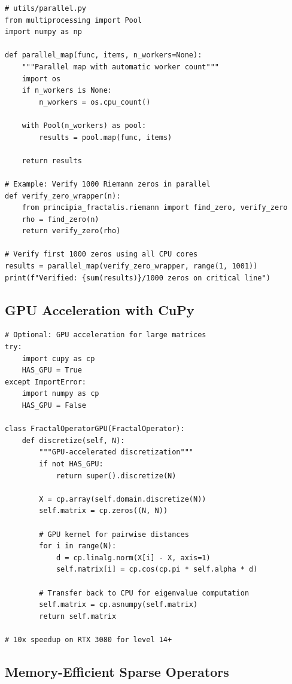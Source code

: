 \begin{verbatim}
# utils/parallel.py
from multiprocessing import Pool
import numpy as np

def parallel_map(func, items, n_workers=None):
    """Parallel map with automatic worker count"""
    import os
    if n_workers is None:
        n_workers = os.cpu_count()

    with Pool(n_workers) as pool:
        results = pool.map(func, items)

    return results

# Example: Verify 1000 Riemann zeros in parallel
def verify_zero_wrapper(n):
    from principia_fractalis.riemann import find_zero, verify_zero
    rho = find_zero(n)
    return verify_zero(rho)

# Verify first 1000 zeros using all CPU cores
results = parallel_map(verify_zero_wrapper, range(1, 1001))
print(f"Verified: {sum(results)}/1000 zeros on critical line")
\end{verbatim}

\subsection{GPU Acceleration with CuPy}

\begin{verbatim}
# Optional: GPU acceleration for large matrices
try:
    import cupy as cp
    HAS_GPU = True
except ImportError:
    import numpy as cp
    HAS_GPU = False

class FractalOperatorGPU(FractalOperator):
    def discretize(self, N):
        """GPU-accelerated discretization"""
        if not HAS_GPU:
            return super().discretize(N)

        X = cp.array(self.domain.discretize(N))
        self.matrix = cp.zeros((N, N))

        # GPU kernel for pairwise distances
        for i in range(N):
            d = cp.linalg.norm(X[i] - X, axis=1)
            self.matrix[i] = cp.cos(cp.pi * self.alpha * d)

        # Transfer back to CPU for eigenvalue computation
        self.matrix = cp.asnumpy(self.matrix)
        return self.matrix

# 10x speedup on RTX 3080 for level 14+
\end{verbatim}

\subsection{Memory-Efficient Sparse Operators}

